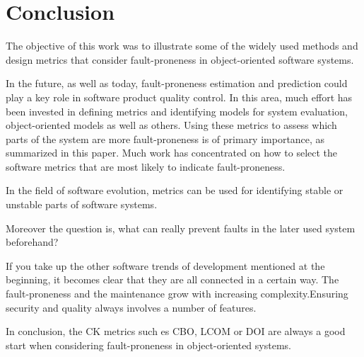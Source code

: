 \section{Conclusion}\label{conclusion}

The objective of this work was to illustrate some of the widely used methods and design metrics that consider fault-proneness in object-oriented software systems.

In the future, as well as today, fault-proneness estimation and prediction could play a key role in software product quality control.  In this area, much effort has been invested in defining metrics and identifying models for system evaluation, object-oriented models as well as others.  Using these metrics to assess which parts of the system are more fault-proneness is of primary importance, as summarized in this paper.
Much work has concentrated on how to select the software metrics that are most likely to indicate fault-proneness. 

In the field of software evolution, metrics can be used for identifying stable or unstable parts of software systems.

Moreover the question is, what can really prevent faults in the later used system beforehand?

If you take up the other software trends of development mentioned at the beginning, it becomes clear that they are all connected in a certain way. The fault-proneness and the maintenance grow with increasing complexity.Ensuring security and quality always involves a number of features.

In conclusion, the CK metrics such es CBO, LCOM or DOI are always a good start when considering fault-proneness in object-oriented systems. 










